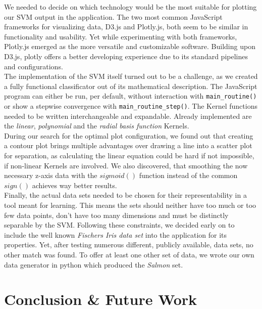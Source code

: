 \documentclass{scrartcl}
\begin{document}
We needed to decide on which technology would be the most suitable for plotting our SVM output in the application. The two most common JavaScript frameworks for visualizing data, D3.js and Plotly.js, both seem to be similar in functionality and usability. Yet while experimenting with both frameworks, Plotly.js emerged as the more versatile and customizable software. Building upon D3.js, plotly offers a better developing experience due to its standard pipelines and configurations.\\

The implementation of the SVM itself turned out to be a challenge, as we created a fully functional classificator out of its mathematical description. The JavaScript program can either be run, per default, without interaction with \verb|main_routine()| or show a stepwise convergence with \verb|main_routine_step()|. The Kernel functions needed to be written interchangeable and expandable. Already implemented are the \textit{linear}, \textit{polynomial} and the \textit{radial basis function} Kernels.\\

During our search for the optimal plot configuration, we found out that creating a contour plot brings multiple advantages over drawing a line into a scatter plot for separation, as calculating the linear equation could be hard if not impossible, if non-linear Kernels are involved. We also discovered, that smoothing the now necessary z-axis data with the $sigmoid()$ function instead of the common $sign()$ achieves way better results.\\

Finally, the actual data sets needed to be chosen for their representability in a tool meant for learning. This means the sets should neither have too much or too few data points, don't have too many dimensions and must be distinctly separable by the SVM. Following these constraints, we decided early on to include the well known \textit{Fischers Iris data set} into the application for its properties. Yet, after testing numerous different, publicly available, data sets, no other match was found. To offer at least one other set of data, we wrote our own data generator in python which produced the \textit{Salmon} set.



\section{Conclusion \& Future Work}
\end{document}
